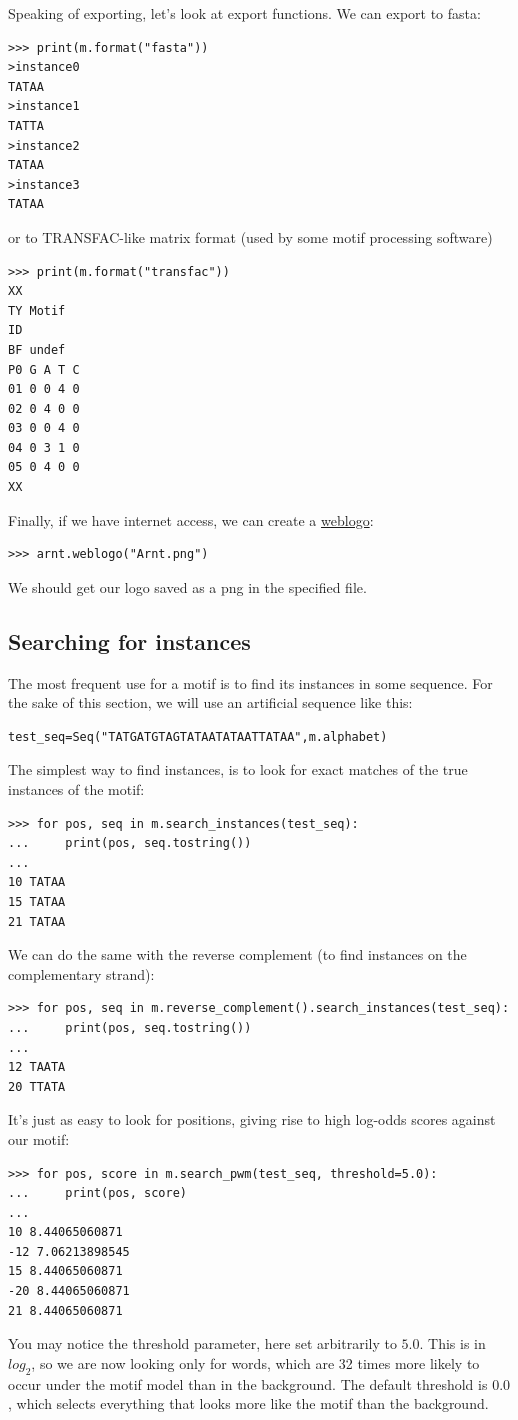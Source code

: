 \documentclass{report}
\begin{document}
Speaking of exporting, let's look at export functions. We can export to fasta:
\begin{verbatim}
>>> print(m.format("fasta"))
>instance0
TATAA
>instance1
TATTA
>instance2
TATAA
>instance3
TATAA
\end{verbatim}
or to TRANSFAC-like matrix format (used by some motif processing software)
\begin{verbatim}
>>> print(m.format("transfac"))
XX
TY Motif
ID 
BF undef
P0 G A T C
01 0 0 4 0
02 0 4 0 0
03 0 0 4 0
04 0 3 1 0
05 0 4 0 0
XX
\end{verbatim}

Finally, if we have internet access, we can create a \href{http://weblogo.berkeley.edu}{weblogo}:
\begin{verbatim}
>>> arnt.weblogo("Arnt.png")
\end{verbatim}
We should get our logo saved as a png in the specified file.

\subsection{Searching for instances}

The most frequent use for a motif is to find its instances in some
sequence. For the sake of this section, we will use an artificial sequence like this:

\begin{verbatim}
test_seq=Seq("TATGATGTAGTATAATATAATTATAA",m.alphabet)
\end{verbatim}

The simplest way to find instances, is to look for exact matches of
the true instances of the motif:
\begin{verbatim}
>>> for pos, seq in m.search_instances(test_seq):
...     print(pos, seq.tostring())
... 
10 TATAA
15 TATAA
21 TATAA
\end{verbatim}
We can do the same with the reverse complement (to find instances on the complementary strand):
\begin{verbatim}
>>> for pos, seq in m.reverse_complement().search_instances(test_seq):
...     print(pos, seq.tostring())
... 
12 TAATA
20 TTATA
\end{verbatim}

It's just as easy to look for positions, giving rise to high log-odds scores against our motif:
\begin{verbatim}
>>> for pos, score in m.search_pwm(test_seq, threshold=5.0):
...     print(pos, score)
... 
10 8.44065060871
-12 7.06213898545
15 8.44065060871
-20 8.44065060871
21 8.44065060871
\end{verbatim}
You may notice the threshold parameter, here set arbitrarily to
$5.0$. This is in $log_2$, so we are now looking only for words, which
are 32 times more likely to occur under the motif model than in the
background. The default threshold is $0.0$, which selects everything
that looks more like the motif than the background.
\end{document}
